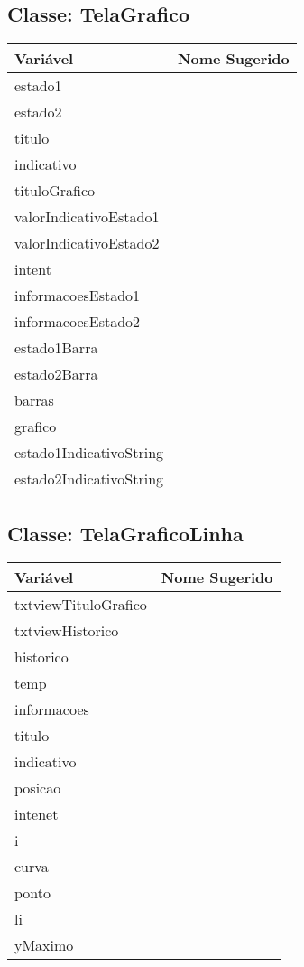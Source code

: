 \documentclass[12pt]{article}
\begin{document}
	\subsection{Classe: TelaGrafico}
		\begin{table}[H]
			\begin{center}
				\begin{tabular}{l | l}
					\toprule
						Variável & Nome Sugerido\\
					\midrule
						estado1 & \\
						estado2 & \\
						titulo & \\
						indicativo & \\
						tituloGrafico & \\
						valorIndicativoEstado1 & \\
						valorIndicativoEstado2 & \\
						intent & \\
						informacoesEstado1 & \\
						informacoesEstado2 & \\
						estado1Barra & \\
						estado2Barra & \\
						barras & \\
						grafico & \\
						estado1IndicativoString & \\
						estado2IndicativoString & \\
					\bottomrule
				\end{tabular}
			\end{center}
		\end{table}

	\subsection{Classe: TelaGraficoLinha}
		\begin{table}[H]
			\begin{center}
				\begin{tabular}{l | l}
					\toprule
						Variável & Nome Sugerido\\
					\midrule
						txtviewTituloGrafico & \\
						txtviewHistorico & \\
						historico & \\
						temp & \\
						informacoes & \\
						titulo & \\
						indicativo & \\
						posicao & \\
						intenet & \\
						i & \\
						curva & \\
						ponto & \\
						li & \\
						yMaximo & \\
					\bottomrule
				\end{tabular}
			\end{center}
		\end{table}
\end{document}
